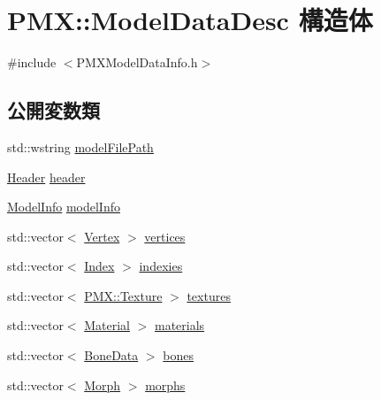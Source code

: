 \hypertarget{struct_p_m_x_1_1_model_data_desc}{}\section{P\+MX\+:\+:Model\+Data\+Desc 構造体}
\label{struct_p_m_x_1_1_model_data_desc}


{\ttfamily \#include $<$P\+M\+X\+Model\+Data\+Info.\+h$>$}

\subsection*{公開変数類}
\begin{DoxyCompactItemize}
\item 
std\+::wstring \mbox{\hyperlink{struct_p_m_x_1_1_model_data_desc_a68efc3cf4008e7ad21e1f8d3358fdee5}{model\+File\+Path}}
\item 
\mbox{\hyperlink{struct_p_m_x_1_1_header}{Header}} \mbox{\hyperlink{struct_p_m_x_1_1_model_data_desc_a1ead04540b79398f2ae7853298146830}{header}}
\item 
\mbox{\hyperlink{struct_p_m_x_1_1_model_info}{Model\+Info}} \mbox{\hyperlink{struct_p_m_x_1_1_model_data_desc_a1061040937cef4cfcbbf88e18ef213bf}{model\+Info}}
\item 
std\+::vector$<$ \mbox{\hyperlink{struct_p_m_x_1_1_vertex}{Vertex}} $>$ \mbox{\hyperlink{struct_p_m_x_1_1_model_data_desc_aa8ec22a2e7921bc95e7cd0435cccd22a}{vertices}}
\item 
std\+::vector$<$ \mbox{\hyperlink{struct_p_m_x_1_1_index}{Index}} $>$ \mbox{\hyperlink{struct_p_m_x_1_1_model_data_desc_ad9aab045cc87255e7d81b982ae4c3adb}{indexies}}
\item 
std\+::vector$<$ \mbox{\hyperlink{struct_p_m_x_1_1_texture}{P\+M\+X\+::\+Texture}} $>$ \mbox{\hyperlink{struct_p_m_x_1_1_model_data_desc_ac937446386ac6c0551c67e01c81d5b5f}{textures}}
\item 
std\+::vector$<$ \mbox{\hyperlink{struct_p_m_x_1_1_material}{Material}} $>$ \mbox{\hyperlink{struct_p_m_x_1_1_model_data_desc_a1e8286c2df43aef64cadffc581cf32de}{materials}}
\item 
std\+::vector$<$ \mbox{\hyperlink{struct_p_m_x_1_1_bone_data}{Bone\+Data}} $>$ \mbox{\hyperlink{struct_p_m_x_1_1_model_data_desc_a05537dc8d57924b4d524dc313f6dae2e}{bones}}
\item 
std\+::vector$<$ \mbox{\hyperlink{struct_p_m_x_1_1_morph}{Morph}} $>$ \mbox{\hyperlink{struct_p_m_x_1_1_model_data_desc_ac86acd041473edf937debb8c7a8afdb7}{morphs}}

\end{DoxyCompactItemize}
